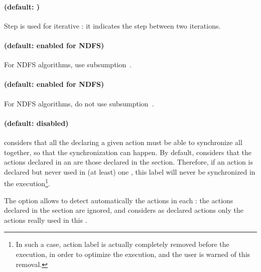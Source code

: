 \paragraph{ (default: )}
Step is used for iterative : it indicates the step between two iterations.


\paragraph{ (default: enabled for NDFS)}
For NDFS algorithms, use subsumption~\cite{NPP18}.

\paragraph{ (default: enabled for NDFS)}
For NDFS algorithms, do not use subsumption~\cite{NPP18}.


\paragraph{ (default: disabled)}
\imitator{} considers that all the \IPTA{} declaring a given action must be able to synchronize all together, so that the synchronization can happen.
By default, \imitator{} considers that the actions declared in an \IPTA{} are those declared in the  section.
Therefore, if an action is declared but never used in (at least) one \IPTA{}, this label will never be synchronized in the execution\footnote{In such a case, action label is actually completely removed before the execution, in order to optimize the execution, and the user is warned of this removal.}.

The option  allows to detect automatically the actions in each \IPTA{}: the actions declared in the  section are ignored, and \imitator{} considers as declared actions only the actions really used in this \IPTA{}.



